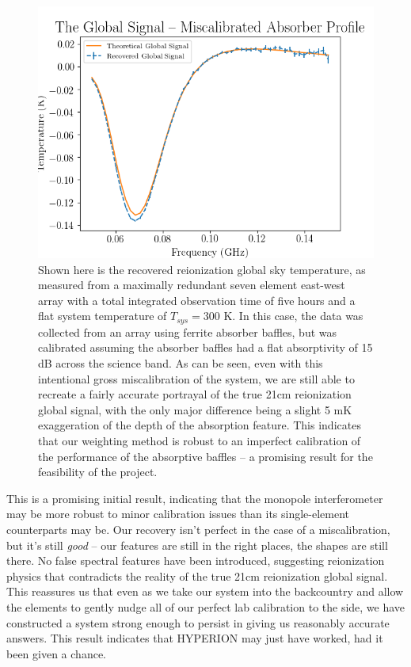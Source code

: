 \begin{figure}
    \begin{center}
    \includegraphics[width=\linewidth]{recovered_signal_diff_abs.png}
    \end{center}
    \caption{
        Shown here is the recovered reionization global sky temperature, as 
        measured from a maximally redundant seven element east-west array with 
        a total integrated observation time of five hours and a flat system 
        temperature of $T_{sys} = 300$ K. In this case, the data was collected 
        from an array using ferrite absorber baffles, but was calibrated 
        assuming the absorber baffles had a flat absorptivity of 15 dB across 
        the science band. As can be seen, even with this intentional gross 
        miscalibration of the system, we are still able to recreate a fairly 
        accurate portrayal of the true 21cm reionization global signal, with 
        the only major difference being a slight 5 mK exaggeration of the depth 
        of the absorption feature. This indicates that our weighting method is 
        robust to an imperfect calibration of the performance of the absorptive 
        baffles -- a promising result for the feasibility of the project.
    }
    \label{fig:recovered-mismatched}
\end{figure}

This is a promising initial result, indicating that the monopole interferometer 
may be more robust to minor calibration issues than its single-element 
counterparts may be. Our recovery isn't perfect in the case of a 
miscalibration, but it's still \emph{good} -- our features are still in the 
right places, the shapes are still there. No false spectral features have been 
introduced, suggesting reionization physics that contradicts the reality of the 
true 21cm reionization global signal.  This reassures us that even as we take 
our system into the backcountry and allow the elements to gently nudge all of 
our perfect lab calibration to the side, we have constructed a system strong 
enough to persist in giving us reasonably accurate answers. This result 
indicates that HYPERION may just have worked, had it been given a chance.
